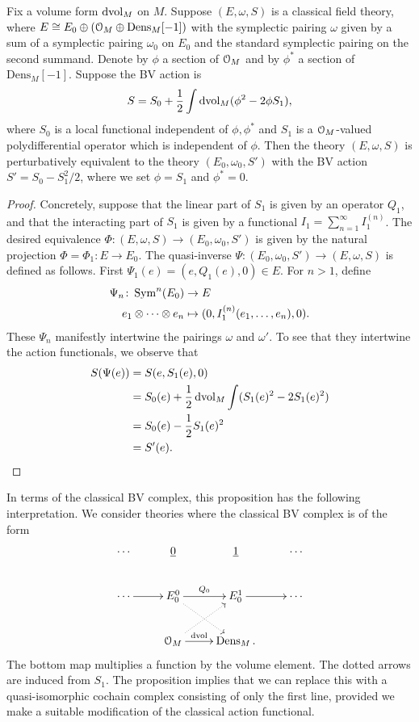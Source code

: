 \documentclass[10pt, oneside]{article}
\newcommand{\Dens}{\mathrm{Dens}}
\begin{document}
\begin{prop}\label{prop:integrateoutfield}
Fix a volume form $\operatorname{dvol}_M$ on $M$. Suppose $(E, \omega, S)$ is a classical field theory, where $E\cong E_0\oplus (\cO_M\oplus \Dens_M[-1])$ with the symplectic pairing $\omega$ given by a sum of a symplectic pairing $\omega_0$ on $E_0$ and the standard symplectic pairing on the second summand. Denote by $\phi$ a section of $\mathcal O_M$ and by $\phi^*$ a section of $\Dens_M[-1]$. Suppose the BV action is
\[S = S_0 + \frac{1}{2} \int \operatorname{dvol}_M (\phi^2 - 2\phi S_1),\]
where $S_0$ is a local functional independent of $\phi,\phi^*$ and $S_1$ is a $\mathcal O_M$-valued polydifferential operator which is independent of $\phi$. 
Then the theory $(E, \omega, S)$ is perturbatively equivalent to the theory $(E_0, \omega_0, S')$ with the BV action $S' = S_0 - S_1^2/2$, where we set $\phi = S_1$ and $\phi^* = 0$.
\end{prop}
\begin{proof}
Concretely, suppose that the linear part of $S_1$ is given by an operator $Q_1$, and that the interacting part of $S_1$ is given by a functional $I_1 = \sum_{n=1}^\infty I_1^{(n)}$.  
The desired equivalence $\Phi \colon (E, \omega, S) \to (E_0, \omega_0, S')$ is given by the natural projection $\Phi = \Phi_1 \colon E \to E_0$. 
The quasi-inverse $\Psi \colon (E_0, \omega_0, S') \to (E, \omega, S)$ is defined as follows.
First $\Psi_1(e) = (e, Q_1(e), 0) \in E$.
For $n > 1$, define
\begin{align*}
\Psi_n \colon \operatorname{Sym}^n(E_0) &\to E \\
e_1 \otimes \cdots \otimes e_n &\mapsto (0, I_1^{(n)}(e_1, \ldots, e_n), 0).
\end{align*}
These $\Psi_n$ manifestly intertwine the pairings $\omega$ and $\omega'$. To see that they intertwine the action functionals, we observe that 
\begin{align*}
S(\Psi(e)) &= S(e, S_1(e), 0) \\
&= S_0(e) + \frac 12 \operatorname{dvol}_M \int (S_1(e)^2 - 2 S_1(e)^2) \\
&= S_0(e) - \frac 12 S_1(e)^2 \\
&= S'(e).
\end{align*}
\end{proof}

\begin{remark}
In terms of the classical BV complex, this proposition has the following interpretation.  We consider theories where the classical BV complex is of the form
\[\xymatrix{
\cdots & \ul{0} & \ul{1} & \cdots \\
\cdots \ar[r] & E_0^0 \ar[r]^{Q_0} \ar@{.>}[dr] & E_0^1 \ar[r] &\cdots \\
&\cO_M \ar^-{{\rm dvol}}[r] \ar@{.>}[ur] &\dens_M. &
}\]
The bottom map multiplies a function by the volume element.
The dotted arrows are induced from $S_1$.
The proposition implies that we can replace this with a quasi-isomorphic cochain complex consisting of only the first line, provided we make a suitable modification of the classical action functional. 
\end{remark}
\end{document}
